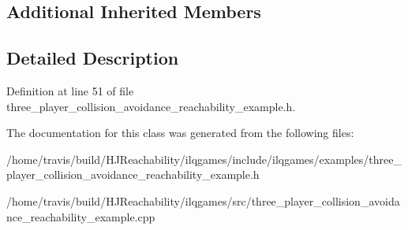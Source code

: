 \subsection*{Additional Inherited Members}


\subsection{Detailed Description}


Definition at line 51 of file three\+\_\+player\+\_\+collision\+\_\+avoidance\+\_\+reachability\+\_\+example.\+h.



The documentation for this class was generated from the following files\+:\begin{DoxyCompactItemize}
\item 
/home/travis/build/\+H\+J\+Reachability/ilqgames/include/ilqgames/examples/three\+\_\+player\+\_\+collision\+\_\+avoidance\+\_\+reachability\+\_\+example.\+h\item 
/home/travis/build/\+H\+J\+Reachability/ilqgames/src/three\+\_\+player\+\_\+collision\+\_\+avoidance\+\_\+reachability\+\_\+example.\+cpp\end{DoxyCompactItemize}
